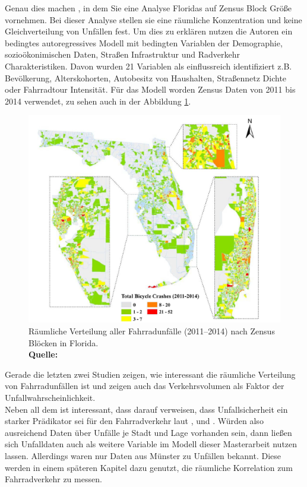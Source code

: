 \documentclass[a4paper,12pt]{thesis}
\newcommand*{\captionsource}[2]{%
	\caption[{#1}]{%
		#1%
		\\\hspace{\linewidth}%
		\textbf{Quelle:} #2%
	}%
}
\begin{document}
Genau dies machen \cite{Saha2018}, in dem Sie eine Analyse Floridas auf Zensus Block Größe vornehmen. Bei dieser Analyse stellen sie eine räumliche Konzentration und keine Gleichverteilung von Unfällen fest. Um dies zu erklären nutzen die Autoren ein bedingtes autoregressives Modell mit bedingten Variablen der Demographie, sozioökonimischen Daten, Straßen Infrastruktur und Radverkehr Charakteristiken. Davon wurden 21 Variablen als einflussreich identifiziert z.B. Bevölkerung, Alterskohorten, Autobesitz von Haushalten, Straßennetz Dichte oder Fahrradtour Intensität. Für das Modell worden Zensus Daten von 2011 bis 2014 verwendet, zu sehen auch in der Abbildung \ref{SAHA}.  
\begin{figure}[!ht]
	\centering
	\includegraphics[width=\textwidth]{Plots/saha.png}
	\captionsource{Räumliche Verteilung aller Fahrradunfälle (2011–2014) nach Zensus Blöcken in Florida.}{
		\cite{Saha2018}
	}
	\label{SAHA}
\end{figure}
Gerade die letzten zwei Studien zeigen, wie interessant die räumliche Verteilung von Fahrradunfällen ist und \cite{Kondo2018} zeigen auch das Verkehrsvolumen als Faktor der Unfallwahrscheinlichkeit.\\
Neben all dem ist interessant, dass \cite{Kondo2018} darauf verweisen, dass Unfallsicherheit ein starker Prädikator sei für den Fahrradverkehr laut \cite{Pucher2010}, \cite{Thomas2013} und \cite{Winters2010}. Würden also ausreichend Daten über Unfälle je Stadt und Lage vorhanden sein, dann ließen sich Unfalldaten auch als weitere Variable im Modell dieser Masterarbeit nutzen lassen. Allerdings waren nur Daten aus Münster zu Unfällen bekannt. Diese werden in einem späteren Kapitel dazu genutzt, die räumliche Korrelation zum Fahrradverkehr zu messen.
\end{document}
